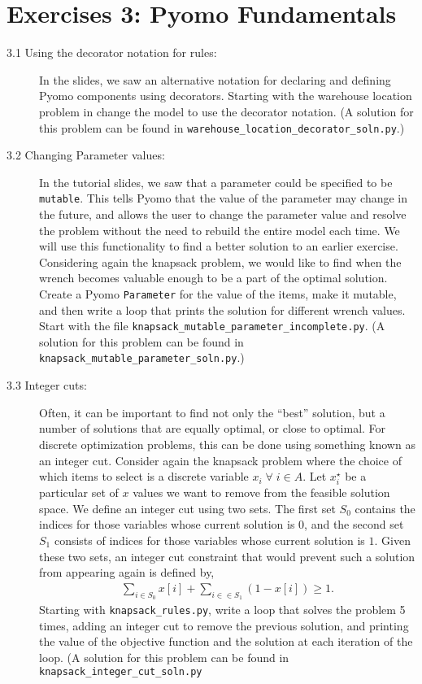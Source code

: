 \documentclass[12pt]{article}
\begin{document}
\section*{Exercises 3: Pyomo Fundamentals}
\begin{description}
\item [3.1 Using the decorator notation for rules:] In the slides, we saw
  an alternative notation for declaring and defining Pyomo components using decorators. Starting with the warehouse location problem in  change the model to use the decorator notation. (A solution for this problem can be found in {\tt warehouse\_location\_decorator\_soln.py}.)
\item [3.2 Changing Parameter values:] In the tutorial slides, we saw that a parameter could be specified to be {\tt mutable}. This tells Pyomo that the value of the parameter may change in the future, and allows the user to change the parameter value and resolve the problem without the need to rebuild the entire model each time. We will use this functionality to find a better solution to an earlier exercise. Considering again the knapsack problem, we would like to find when the wrench becomes valuable enough to be a part of the optimal solution. Create a Pyomo {\tt Parameter} for the value of the items, make it mutable, and then write a loop that prints the solution for different wrench values. Start with the file {\tt knapsack\_mutable\_parameter\_incomplete.py}. (A solution for this problem can be found in {\tt knapsack\_mutable\_parameter\_soln.py}.)

\item [3.3 Integer cuts:] Often, it can be important to find not only the ``best'' solution, but a number of solutions that are equally optimal, or close to optimal. For discrete optimization problems, this can be done using something known as an integer cut. Consider again the knapsack problem where the choice of which items to select is a discrete variable  $x_i \; \forall \; i \in A$. Let $x_i^\star$ be a particular set of $x$ values we want to remove from the feasible solution space. We define an integer cut using two sets. The first set $S_0$ contains the indices for those variables whose current solution is $0$, and the second set $S_1$ consists of indices for those variables whose current solution is $1$. Given these two sets, an integer cut constraint that would prevent such a solution from appearing again is defined by,
  \begin{align*}
    \sum_{i \in S_0} x[i] + \sum_{i \in \in S_1}(1 - x[i]) \geq 1.
  \end{align*}
Starting with {\tt knapsack\_rules.py}, write a loop that solves the problem 5 times, adding an integer cut to remove the previous solution, and printing the value of the objective function and the solution at each iteration of the loop. (A solution for this problem can be found in {\tt knapsack\_integer\_cut\_soln.py}


\end{description}
\end{document}
